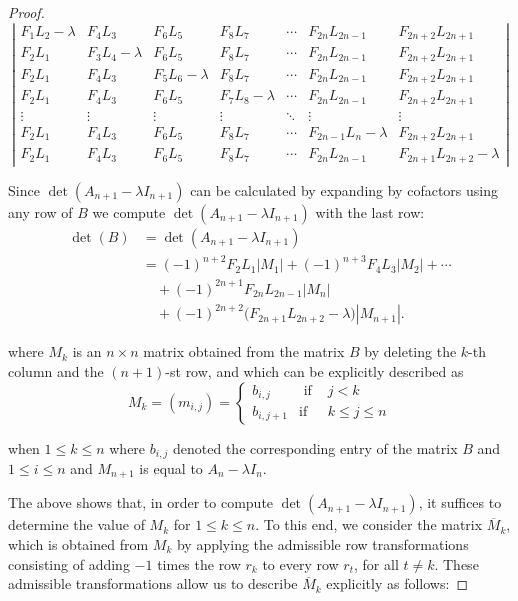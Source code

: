\documentclass[10pt,a4paper]{amsart}
\begin{document}
\begin{proof}
$$\left|\begin{array}{ccccccc}
F_1 L_2-\lambda & F_4 L_3 & F_6 L_5 & F_8 L_7 & \cdots & F_{2 n} L_{2 n-1} & F_{2 n+2} L_{2 n+1} \\
F_2 L_1 & F_3 L_4-\lambda & F_6 L_5 & F_8 L_7 & \cdots & F_{2 n} L_{2 n-1} & F_{2 n+2} L_{2 n+1} \\
F_2 L_1 & F_4 L_3 & F_5L_6-\lambda & F_8 L_7 & \cdots & F_{2 n} L_{2 n-1} & F_{2 n+2} L_{2 n+1} \\
F_2 L_1 & F_4 L_3 & F_6 L_5 & F_7 L_8-\lambda & \cdots & F_{2 n} L_{2 n-1} & F_{2 n+2} L_{2 n+1} \\
\vdots & \vdots & \vdots & \vdots & \ddots & \vdots & \vdots \\
F_2 L_1 & F_4 L_3 & F_6 L_5 & F_8 L_7 & \cdots & F_{2 n-1} L_n-\lambda & F_{2 n+2} L_{2 n+1} \\
F_2 L_1 & F_4 L_3 & F_6 L_5 & F_8 L_7 & \cdots & F_{2 n} L_{2 n-1} & F_{2 n+1} L_{2 n+2}-\lambda
\end{array}\right|$$

\noindent Since $\operatorname{det}\left(A_{n+1}-\lambda I_{n+1}\right)$ can be calculated by expanding by cofactors using any row of $B$ we compute $\operatorname{det}\left(A_{n+1}-\lambda I_{n+1}\right)$ with the last row: 
\begin{align*}
\operatorname{det}(B)
&= \operatorname{det}(A_{n+1}-\lambda I_{n+1}) \\
&= (-1)^{n+2}F_2L_1|M_1|
 + (-1)^{n+3}F_{4}L_{3}|M_2| + \cdots \\
&\quad + (-1)^{2n+1}F_{2n}L_{2n-1}|M_n| \\
&\quad + (-1)^{2n+2}\bigl(F_{2n+1}L_{2n+2}-\lambda\bigr)|M_{n+1}|.
\end{align*}


\noindent where $M_k$ is an $n \times n$ matrix obtained from the matrix $B$ by deleting the $k$-th column and the $(n+1)$-st row, and which can be explicitly described as
$$
M_k=(m_{i,j})=\left\{\begin{array}{lll}
b_{i,j} & \text { if } & j<k \\
b_{i,j+1} & \text {if} & k \leq j \leq n
\end{array}\right.
$$

\noindent when $1\leq k\leq n$ where $b_{i,j}$ denoted the corresponding entry of the matrix $B$ and $1\leq i \leq n$ and $M_{n+1}$ is equal to $A_{n}-\lambda I_n$.

\noindent The above shows that, in order to compute $\operatorname{det}\left(A_{n+1}-\lambda I_{n+1}\right)$, it suffices to determine the value of $M_k$ for $1 \leq k \leq n$. To this end, we consider the matrix $\overline{M}_k$, which is obtained from $M_k$ by applying the admissible row transformations consisting of adding $-1$ times the row $r_k$ to every row $r_t$, for all $t \neq k$. These admissible transformations allow us to describe $\overline{M}_k$ explicitly as follows:


\end{proof}
\end{document}
